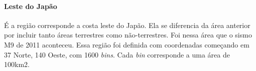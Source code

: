 \paragraph{Leste do Japão} É a região corresponde a costa leste do Japão. Ela se diferencia da área anterior por incluir tanto áreas terrestres como não-terrestres. Foi nessa área que o sismo M9 de 2011 aconteceu. Essa região foi definida com coordenadas começando em 37 Norte, 140 Oeste, com  1600 {\it bins}. Cada {\it bin} corresponde a uma área de 100km2. \\

%




